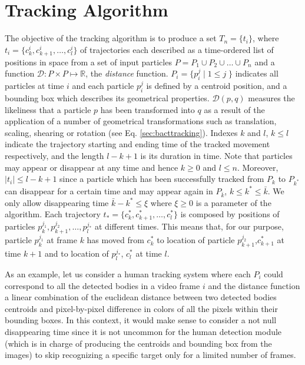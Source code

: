 \documentclass[conference]{IEEEtran}
\begin{document}
\section{Tracking Algorithm}\label{trackalgorithm}
The objective of the tracking algorithm is to produce a 
set $ T_n = \{ t_i \}$, where $t_i=\{ c^i_k,c^i_{k+1},\ldots,c^i_l \} $ 
of trajectories each described as a time-ordered list of positions in space from a set of input 
particles $P=P_1 \cup P_2 \cup \ldots \cup P_n$ and a function $\mathcal{D} :  P \times P \mapsto \mathbb{R}$, 
the \textit{distance} function. $P_i = \{p^j_i \; | \; 1 \leq j\; \}$ indicates all particles at time $i$ and each particle $p_i^j$ is defined by a centroid position, and a bounding box which describes its geometrical properties.
$\mathcal{D}(p,q)$ measures the likeliness that a particle $p$ has been transformed into $q$ as a result of the application of a number of geometrical transformations such as translation, scaling, shearing or rotation (see Eq. \ref{sec:bacttracking}). 
Indexes $k$ and $l$, $k \leq l$ indicate the trajectory starting and ending time of the tracked movement respectively, and the length $l-k+1$ is its duration in time.
Note that particles may appear or disappear at any time and hence $k\geq 0$ and $l \leq n$. Moreover, $|t_i| \leq l-k+1$ since a particle which has been successfully tracked
 from  $P_k$ to $P_{k^*} $ can disappear for a certain time and may appear again in $P_{\bar{k}}$, $k \leq k^* \leq \bar{k}$. We only allow disappearing time $\bar{k}-k^* \leq \xi$ where $\xi \geq 0$ is a parameter of the algorithm. 
Each trajectory  $t_*=\{ c^*_k,c^*_{k+1},\ldots,c^*_l \} $ is composed by  positions of particles $p^{j_1}_k,p^{j_2}_{k+1},\ldots,p^{j_*}_l$ at different times. 
This means that, for our purpose, particle $p^{j_1}_k$ at frame $k$ has moved from $c^*_k$ to location of particle $p^{j_2}_{k+1}$,$c^*_{k+1}$ at time ${k+1}$ and to location of $p^{j_*}_{l}$, $c^*_l$ at time $l$. 

As an example, let us consider a human tracking system where each $P_i$ could correspond to all the detected bodies in a  video frame $i$ and the distance function a linear combination of the euclidean distance between two detected bodies centroids  and pixel-by-pixel difference in colors of all the pixels within their bounding boxes. In this context, it would make sense to consider a not null disappearing time since it is not uncommon for the human detection module (which is in charge of producing the centroids and bounding box from the images) to skip recognizing a specific target only for a limited number of frames. 
\end{document}
